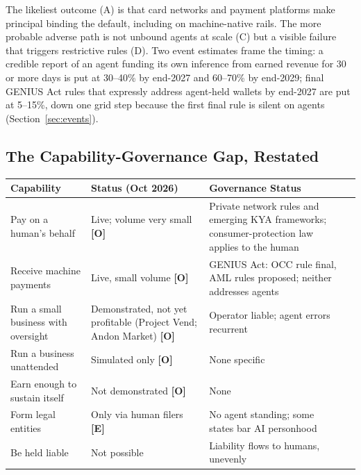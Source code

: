\documentclass[11pt,letterpaper]{article}
\renewcommand{\arraystretch}{1.3}
\begin{document}
The likeliest outcome (A) is that card networks and payment platforms make principal binding the default, including on machine-native rails. The more probable adverse path is not unbound agents at scale (C) but a visible failure that triggers restrictive rules (D). Two event estimates frame the timing: a credible report of an agent funding its own inference from earned revenue for 30 or more days is put at 30--40\% by end-2027 and 60--70\% by end-2029; final GENIUS Act rules that expressly address agent-held wallets by end-2027 are put at 5--15\%, down one grid step because the first final rule is silent on agents (Section~\ref{sec:events}).

\subsection*{The Capability-Governance Gap, Restated}

\begin{center}
\small\renewcommand{\arraystretch}{1.15}
\begin{tabularx}{\linewidth}{ZY{0.89}Y{0.97}Y{1.14}}
\toprule
\textbf{Capability} & \textbf{Status (Oct 2026)} & \textbf{Governance Status} \\
\midrule
Pay on a human's behalf & Live; volume very small \textbf{[O]} & Private network rules and emerging KYA frameworks; consumer-protection law applies to the human \\
Receive machine payments & Live, small volume \textbf{[O]} & GENIUS Act: OCC rule final, AML rules proposed; neither addresses agents \\
Run a small business with oversight & Demonstrated, not yet profitable (Project Vend; Andon Market) \textbf{[O]} & Operator liable; agent errors recurrent \\
Run a business unattended & Simulated only \textbf{[O]} & None specific \\
Earn enough to sustain itself & Not demonstrated \textbf{[O]} & None \\
Form legal entities & Only via human filers \textbf{[E]} & No agent standing; some states bar AI personhood \\
Be held liable & Not possible & Liability flows to humans, unevenly \\
\bottomrule
\end{tabularx}
\end{center}
\end{document}
